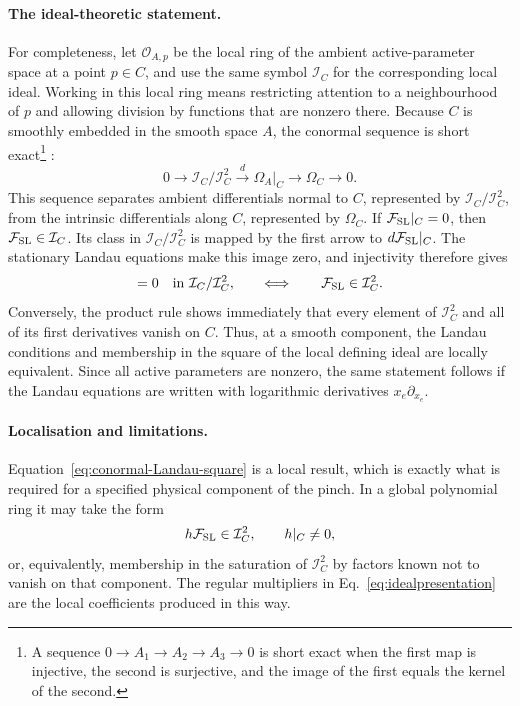 \documentclass[a4paper,11pt]{article}
\newcommand{\FSL}{\mathcal F_{\rm SL}}
\newcommand{\ideal}{\mathcal I}
\begin{document}
\paragraph{The ideal-theoretic statement.}
For completeness, let \(\mathcal O_{A,p}\) be the local ring of the ambient
active-parameter space at a point \(p\in C\), and use the same symbol
\(\ideal_C\) for the corresponding local ideal.  Working in this local ring
means restricting attention to a neighbourhood of \(p\) and allowing division
by functions that are nonzero there.  Because \(C\) is smoothly
embedded in the smooth space \(A\), the conormal sequence is short exact\footnote{A
sequence \(0\to A_1\to A_2\to A_3\to0\) is short exact when the first map is
injective, the second is surjective, and the image of the first equals the
kernel of the second.}
\cite{StacksConormalSequence}:
\begin{equation}
 0\longrightarrow \ideal_C/\ideal_C^2
 \xrightarrow{\ d\ }
 \Omega_A\big|_C
 \longrightarrow \Omega_C\longrightarrow0.
 \label{eq:conormal-exact-sequence}
\end{equation}
This sequence separates ambient differentials normal to \(C\), represented by
\(\ideal_C/\ideal_C^2\), from the intrinsic differentials along \(C\),
represented by \(\Omega_C\).
If \(\FSL|_C=0\), then \(\FSL\in\ideal_C\).  Its class in
\(\ideal_C/\ideal_C^2\) is mapped by the first arrow to
\(d\FSL|_C\).  The stationary Landau equations make this image zero, and
injectivity therefore gives
\begin{equation}
 [\FSL]=0\quad\hbox{in }\ideal_C/\ideal_C^2,
 \qquad\Longleftrightarrow\qquad
 \FSL\in\ideal_C^2.
 \label{eq:conormal-Landau-square}
\end{equation}
Conversely, the product rule shows immediately that every element of
\(\ideal_C^2\) and all of its first derivatives vanish on \(C\).  Thus, at a
smooth component, the Landau conditions and membership in the square of the
local defining ideal are locally equivalent.  Since all active parameters are nonzero, the
same statement follows if the Landau equations are written with logarithmic
derivatives \(x_e\partial_{x_e}\).

\paragraph{Localisation and limitations.}
Equation~\eqref{eq:conormal-Landau-square} is a local result, which is exactly
what is required for a specified physical component of the pinch.  In a
global polynomial ring it may take the form
\begin{equation}
 h\FSL\in\ideal_C^2,
 \qquad h|_C\ne0,
 \label{eq:localised-square-membership}
\end{equation}
or, equivalently, membership in the saturation of \(\ideal_C^2\) by factors
known not to vanish on that component.  The regular multipliers in
Eq.~\eqref{eq:idealpresentation} are the local coefficients produced in this
way.
\end{document}
